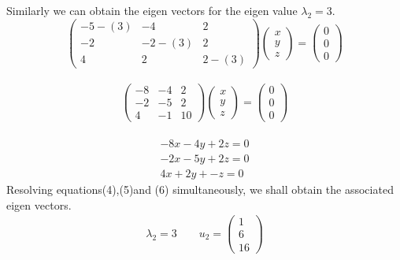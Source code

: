 \documentclass[12pt,a4paper]{article}
\begin{document}
\begin{itemize}
\begin{itemize}
Similarly we can obtain the eigen vectors for the eigen value $\lambda_{2}=3$.\\
\[
\begin{pmatrix} -5-\left(3\right) & -4 & 2 \\ -2 & -2-\left(3\right) & 2\\4 &2 &2-\left(3\right) \end{pmatrix} \begin{pmatrix} x \\ y \\z \end{pmatrix}=\begin{pmatrix} 0 \\ 0 \\0 \end{pmatrix}\]\\
\[
\begin{pmatrix} -8 & -4 & 2 \\ -2 & -5 & 2\\4 &-1 &10 \end{pmatrix} \begin{pmatrix} x \\ y \\z \end{pmatrix}=\begin{pmatrix} 0 \\ 0 \\0 \end{pmatrix}
\]\\
\begin{align}
-8x-4y+2z=0\\
-2x-5y+2z=0\\
4x+2y+-z=0
\end{align}
Resolving equations(4),(5)and (6) simultaneously, we shall obtain the associated eigen vectors.\\
\begin{align*}
\lambda_{2}=3\quad \quad u_{2}=
\begin{pmatrix} 1 \\ 6 \\16 \end{pmatrix}
\end{align*}


\end{itemize}
\end{itemize}
\end{document}
